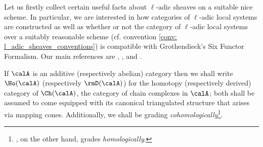 Let us firstly collect certain useful facts about $\ell$-adic sheaves on a suitable nice scheme. In particular, we are interested in how categories of $\ell$-adic local systems are constructed as well as whether or not the category of $\ell$-adic local systems over a suitably reasonable scheme (cf. convention \ref{conv: l_adic_sheaves_conventions}) is compatible with Grothendieck's Six Functor Formalism. Our main references are \cite{conrad_etale_cohomology}, \cite[Chapter 1]{behrend_l_adic_sheaves_for_algebraic_stacks}, and \cite{laszlo_olsson_adic_sheaves_on_artin_stacks_2}.
        
        \begin{convention}
            If $\calA$ is an additive (respectively abelian) category then we shall write $\Ho(\calA)$ (respectively $\rmD(\calA)$) for the homotopy (respectively derived) category of $\Ch(\calA)$, the category of chain complexes in $\calA$; both shall be assumed to come equipped with its canonical triangulated structure that arises via mapping cones. Additionally, we shall be grading \textit{cohomologically}\footnote{\cite[Section 1.4]{conrad_etale_cohomology}, on the other hand, grades \textit{homologically}.}.
        \end{convention}
        
